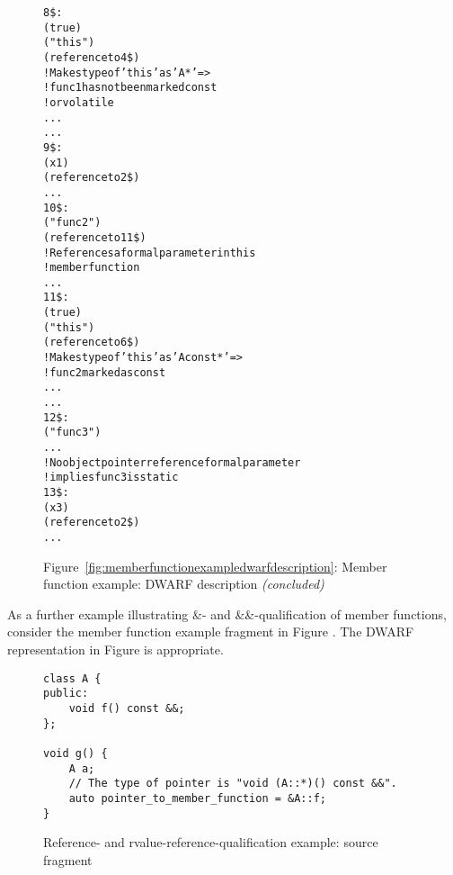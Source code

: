 \begin{figure}[p]
\begin{dwflisting}
\begin{alltt}

8\$:         \DWTAGformalparameter
                \DWATartificial(true)
                \DWATname("this")
                \DWATtype(reference to 4\$)
                    ! Makes type of 'this' as 'A*' =>
                    ! func1 has not been marked const 
                    ! or volatile
                \DWATlocation ...
                ...
9\$:         \DWTAGformalparameter
                \DWATname(x1)
                \DWATtype(reference to 2\$)
                ...
10\$:    \DWTAGsubprogram
            \DWATdeclaration
            \DWATname("func2")
            \DWATobjectpointer(reference to 11\$) 
            ! References a formal parameter in this 
            ! member function
            ...
11\$:        \DWTAGformalparameter
                \DWATartificial(true)
                \DWATname("this")
                \DWATtype(reference to 6\$)
                ! Makes type of 'this' as 'A const*' =>
                !     func2 marked as const
                \DWATlocation ...
                ...
12\$:    \DWTAGsubprogram
            \DWATdeclaration
            \DWATname("func3")
            ...
                ! No object pointer reference formal parameter
                ! implies func3 is static
13\$:        \DWTAGformalparameter
                \DWATname(x3)
                \DWATtype(reference to 2\$)
                ...

\end{alltt}
\end{dwflisting}
\begin{center}
\vspace{3mm}
Figure~\ref{fig:memberfunctionexampledwarfdescription}: Member function example: DWARF description \textit{(concluded)}
\end{center}
\end{figure}

\clearpage
As a further example illustrating \&- and \&\&-qualification
of member functions, 
consider the member function example fragment in 
Figure .
The DWARF representation in 
Figure 
is appropriate.

\begin{figure}[h]
\begin{lstlisting}
class A {
public:
    void f() const &&;
};
   
void g() {
    A a;
    // The type of pointer is "void (A::*)() const &&".
    auto pointer_to_member_function = &A::f;
}
\end{lstlisting}
\caption{Reference- and rvalue-reference-qualification example: source \mbox{fragment}}
\label{fig:memberfunctionrefqualexamplesourcefragment}
\end{figure}

